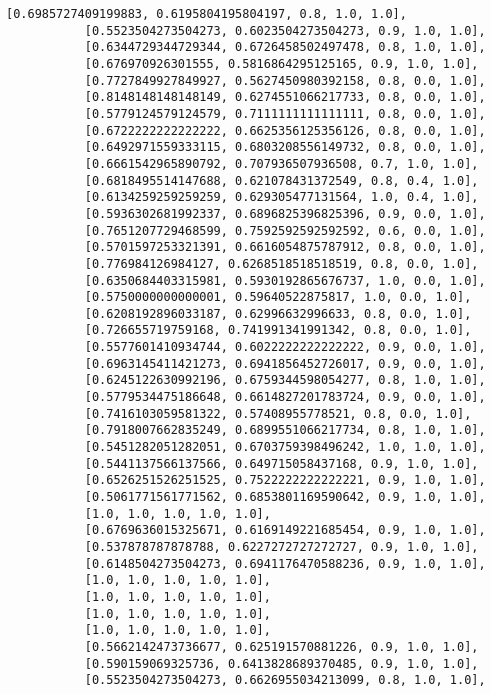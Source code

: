 \documentclass[11pt]{article}
\begin{document}
\begin{Verbatim}[commandchars=\\\{\}]
           [0.6985727409199883, 0.6195804195804197, 0.8, 1.0, 1.0],
           [0.5523504273504273, 0.6023504273504273, 0.9, 1.0, 1.0],
           [0.6344729344729344, 0.6726458502497478, 0.8, 1.0, 1.0],
           [0.676970926301555, 0.5816864295125165, 0.9, 1.0, 1.0],
           [0.7727849927849927, 0.5627450980392158, 0.8, 0.0, 1.0],
           [0.8148148148148149, 0.6274551066217733, 0.8, 0.0, 1.0],
           [0.5779124579124579, 0.7111111111111111, 0.8, 0.0, 1.0],
           [0.6722222222222222, 0.6625356125356126, 0.8, 0.0, 1.0],
           [0.6492971559333115, 0.6803208556149732, 0.8, 0.0, 1.0],
           [0.6661542965890792, 0.707936507936508, 0.7, 1.0, 1.0],
           [0.6818495514147688, 0.621078431372549, 0.8, 0.4, 1.0],
           [0.6134259259259259, 0.629305477131564, 1.0, 0.4, 1.0],
           [0.5936302681992337, 0.6896825396825396, 0.9, 0.0, 1.0],
           [0.7651207729468599, 0.7592592592592592, 0.6, 0.0, 1.0],
           [0.5701597253321391, 0.6616054875787912, 0.8, 0.0, 1.0],
           [0.776984126984127, 0.6268518518518519, 0.8, 0.0, 1.0],
           [0.6350684403315981, 0.5930192865676737, 1.0, 0.0, 1.0],
           [0.5750000000000001, 0.59640522875817, 1.0, 0.0, 1.0],
           [0.6208192896033187, 0.62996632996633, 0.8, 0.0, 1.0],
           [0.726655719759168, 0.741991341991342, 0.8, 0.0, 1.0],
           [0.5577601410934744, 0.6022222222222222, 0.9, 0.0, 1.0],
           [0.6963145411421273, 0.6941856452726017, 0.9, 0.0, 1.0],
           [0.6245122630992196, 0.6759344598054277, 0.8, 1.0, 1.0],
           [0.5779534475186648, 0.6614827201783724, 0.9, 0.0, 1.0],
           [0.7416103059581322, 0.57408955778521, 0.8, 0.0, 1.0],
           [0.7918007662835249, 0.6899551066217734, 0.8, 1.0, 1.0],
           [0.5451282051282051, 0.6703759398496242, 1.0, 1.0, 1.0],
           [0.5441137566137566, 0.649715058437168, 0.9, 1.0, 1.0],
           [0.6526251526251525, 0.7522222222222221, 0.9, 1.0, 1.0],
           [0.5061771561771562, 0.6853801169590642, 0.9, 1.0, 1.0],
           [1.0, 1.0, 1.0, 1.0, 1.0],
           [0.6769636015325671, 0.6169149221685454, 0.9, 1.0, 1.0],
           [0.537878787878788, 0.6227272727272727, 0.9, 1.0, 1.0],
           [0.6148504273504273, 0.6941176470588236, 0.9, 1.0, 1.0],
           [1.0, 1.0, 1.0, 1.0, 1.0],
           [1.0, 1.0, 1.0, 1.0, 1.0],
           [1.0, 1.0, 1.0, 1.0, 1.0],
           [1.0, 1.0, 1.0, 1.0, 1.0],
           [0.5662142473736677, 0.625191570881226, 0.9, 1.0, 1.0],
           [0.590159069325736, 0.6413828689370485, 0.9, 1.0, 1.0],
           [0.5523504273504273, 0.6626955034213099, 0.8, 1.0, 1.0],

\end{Verbatim}
\end{document}
